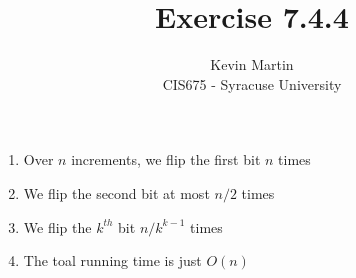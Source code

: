 \documentclass{article}
\author{Kevin Martin\\ CIS675 - Syracuse University}
\title{Exercise 7.4.4}
\begin{document}
\maketitle
\begin{enumerate}
  \item Over $n$ increments, we flip the first bit $n$ times
  \item We flip the second bit at most $n/2$ times
  \item We flip the $k^{th}$ bit $n/k^{k-1}$ times
  \item The toal running time is just $O(n)$ 
\end{enumerate}
\end{document}
